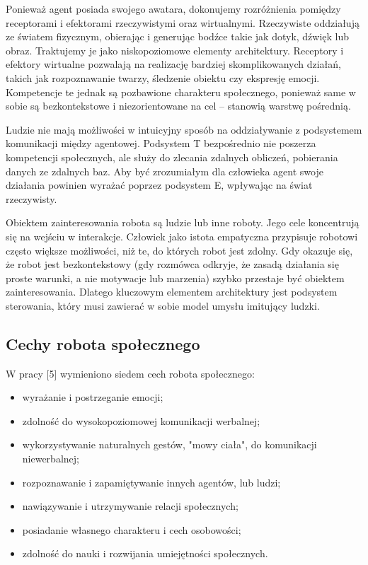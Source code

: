 Ponieważ agent posiada swojego awatara, dokonujemy rozróżnienia pomiędzy receptorami i efektorami rzeczywistymi oraz wirtualnymi. Rzeczywiste oddziałują ze światem fizycznym, obierając i generując bodźce takie jak dotyk, dźwięk lub obraz. Traktujemy je jako niskopoziomowe elementy architektury. Receptory i efektory wirtualne pozwalają na realizację bardziej skomplikowanych działań, takich jak rozpoznawanie twarzy, śledzenie obiektu czy ekspresję emocji. Kompetencje te jednak są pozbawione charakteru społecznego, ponieważ same w sobie są bezkontekstowe i niezorientowane na cel – stanowią warstwę pośrednią.

Ludzie nie mają możliwości w intuicyjny sposób na oddziaływanie z podsystemem komunikacji między agentowej. Podsystem T bezpośrednio nie poszerza kompetencji społecznych, ale służy do zlecania zdalnych obliczeń, pobierania danych ze zdalnych baz. Aby być zrozumiałym dla człowieka agent swoje działania powinien wyrażać poprzez podsystem E, wpływając na świat rzeczywisty. 

Obiektem zainteresowania robota są ludzie lub inne roboty. Jego cele koncentrują się na wejściu w interakcje. Człowiek jako istota empatyczna przypisuje robotowi często większe możliwości, niż te, do których robot jest zdolny. Gdy okazuje się, że robot jest bezkontekstowy (gdy rozmówca odkryje, że zasadą działania się proste warunki, a nie motywacje lub marzenia) szybko przestaje być obiektem zainteresowania. Dlatego kluczowym elementem architektury jest podsystem sterowania, który musi zawierać w sobie model umysłu imitujący ludzki. 

\subsection{Cechy robota społecznego}

W pracy [5] %
wymieniono siedem cech robota społecznego:
\begin{itemize}
    \setlength\itemsep{-0.4em}
    \item wyrażanie i postrzeganie emocji;
    \item zdolność do wysokopoziomowej komunikacji werbalnej; 
    \item wykorzystywanie naturalnych gestów, "mowy ciała", do komunikacji niewerbalnej;
    \item rozpoznawanie i zapamiętywanie innych agentów, lub ludzi;
    \item nawiązywanie i utrzymywanie relacji społecznych;
    \item posiadanie własnego charakteru i cech osobowości;
    \item zdolność do nauki i rozwijania umiejętności społecznych.
\end{itemize}

